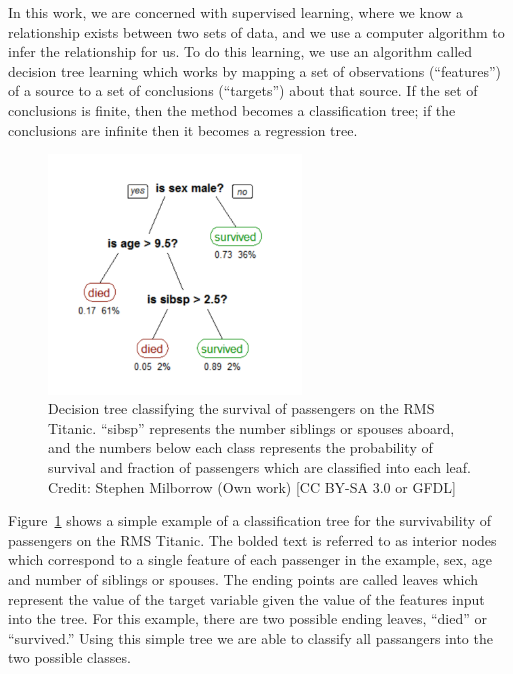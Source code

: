 In this work, we are concerned with supervised learning, where we know a relationship exists between two sets of data, and we use a computer algorithm to infer the relationship for us. To do this learning, we use an algorithm called decision tree learning which works by mapping a set of observations (``features'') of a source to a set of conclusions (``targets'') about that source. If the set of conclusions is finite, then the method becomes a classification tree; if the conclusions are infinite then it becomes a regression tree. 

\begin{figure}[ht]
	\begin{center}
		\includegraphics[width=0.6\textwidth]{figures/CART_tree_titanic_survivors.pdf} 
	\end{center}
	\caption[An example of a classification tree.]{Decision tree classifying the survival of passengers on the RMS Titanic. ``sibsp'' represents the number siblings or spouses aboard, and the numbers below each class represents the probability of survival and fraction of passengers which are classified into each leaf. Credit: Stephen Milborrow (Own work) [CC BY-SA 3.0 or GFDL]}
	\label{fig: cart tree} 
\end{figure}

Figure~\ref{fig: cart tree} shows a simple example of a classification tree for the survivability of passengers on the RMS Titanic. The bolded text is referred to as interior nodes which correspond to a single feature of each passenger in the example, sex, age and number of siblings or spouses. The ending points are called leaves which represent the value of the target variable given the value of the features input into the tree. For this example, there are two possible ending leaves, ``died'' or ``survived.'' Using this simple tree we are able to classify all passangers into the two possible classes. 

